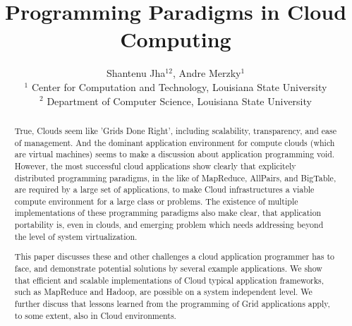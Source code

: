 \documentclass{article}
\begin{document}
\title{\large Programming Paradigms in Cloud Computing}

\author{Shantenu Jha$^{12}$,
        Andre Merzky$^1$\\[1em]
        $^1$\small
          Center for Computation and Technology, 
          Louisiana State University\\
        $^2$ \small
          Department of Computer Science, 
          Louisiana State University
       }

\maketitle

\begin{abstract}

  True, Clouds seem like 'Grids Done Right', including scalability,
  transparency, and ease of management.  And the dominant application
  environment for compute clouds (which are virtual machines) seems to
  make a discussion about application programming void.  However, the
  most successful cloud applications show clearly that explicitely
  distributed programming paradigms, in the like of MapReduce,
  AllPairs, and BigTable, are required by a large set of applications,
  to make Cloud infrastructures a viable compute environment for a
  large class or problems.  The existence of multiple implementations
  of these programming paradigms also make clear, that application
  portability is, even in clouds, and emerging problem which needs
  addressing beyond the level of system virtualization.

  This paper discusses these and other challenges a cloud application
  programmer has to face, and demonstrate potential solutions by
  several example applications.  We show that efficient and scalable
  implementations of Cloud typical application frameworks, such as
  MapReduce and Hadoop, are possible on a system independent level.
  We further discuss that lessons learned from the programming of Grid
  applications apply, to some extent, also in Cloud environments.

\end{abstract}

\tableofcontents
\end{document}
